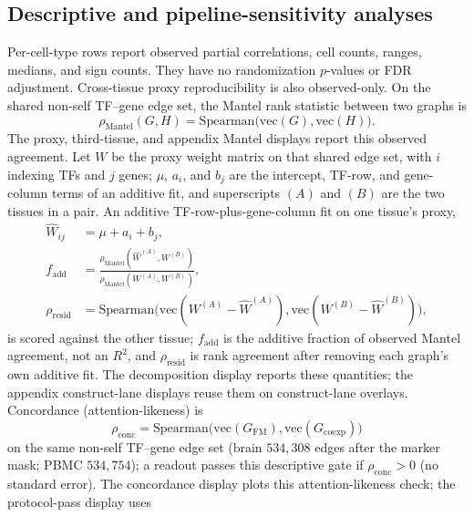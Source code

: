 \documentclass[fleqn,10pt,lineno]{wlpeerj}
\begin{document}
\subsection{Descriptive and pipeline-sensitivity analyses}
Per-cell-type rows report observed partial correlations, cell counts, ranges, medians, and sign counts.
They have no randomization $p$-values or FDR adjustment. Cross-tissue proxy reproducibility is also
observed-only.
On the shared non-self TF--gene edge set, the Mantel rank statistic between two graphs is
\begin{equation}
\label{eq:mantel}
\rho_{\mathrm{Mantel}}(G,H)
=
\mathrm{Spearman}\bigl(\mathrm{vec}(G),\mathrm{vec}(H)\bigr).
\end{equation}
The proxy, third-tissue, and appendix Mantel displays report this observed agreement.
Let $W$ be the proxy weight matrix on that shared edge set, with $i$ indexing TFs and $j$ genes;
$\mu$, $a_i$, and $b_j$ are the intercept, TF-row, and gene-column terms of an additive fit, and
superscripts $(A)$ and $(B)$ are the two tissues in a pair. An additive TF-row-plus-gene-column
fit on one tissue's proxy,
\begin{equation}
\label{eq:decomp}
\begin{aligned}
\widehat{W}_{ij}
&=
\mu+a_i+b_j,\\
f_{\mathrm{add}}
&=
\frac{\rho_{\mathrm{Mantel}}(\widehat{W}^{(A)},W^{(B)})}{\rho_{\mathrm{Mantel}}(W^{(A)},W^{(B)})},\\
\rho_{\mathrm{resid}}
&=
\mathrm{Spearman}\bigl(\mathrm{vec}(W^{(A)}-\widehat{W}^{(A)}),\mathrm{vec}(W^{(B)}-\widehat{W}^{(B)})\bigr),
\end{aligned}
\end{equation}
is scored against the other tissue; $f_{\mathrm{add}}$ is the additive fraction of observed
Mantel agreement, not an $R^{2}$, and $\rho_{\mathrm{resid}}$ is rank agreement after removing each
graph's own additive fit.
The decomposition display reports these quantities; the appendix construct-lane displays reuse them
on construct-lane overlays.
Concordance (attention-likeness) is
\begin{equation}
\label{eq:concordance}
\rho_{\mathrm{conc}}
=
\mathrm{Spearman}\bigl(\mathrm{vec}(G_{\mathrm{FM}}),\mathrm{vec}(G_{\mathrm{coexp}})\bigr)
\end{equation}
on the same non-self TF--gene edge set (brain $534{,}308$ edges after the marker mask; PBMC
$534{,}754$); a readout passes this descriptive gate if $\rho_{\mathrm{conc}}>0$ (no
standard error).
The concordance display plots this attention-likeness check; the protocol-pass display uses
\end{document}
